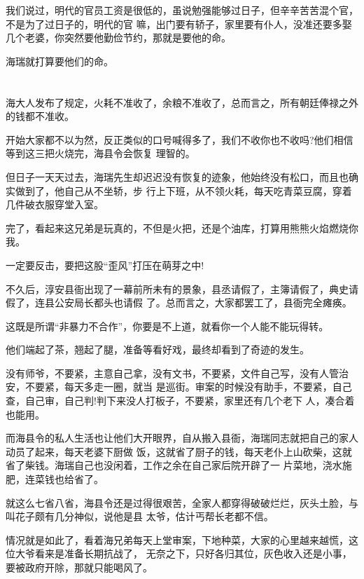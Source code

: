 \documentclass[11pt,a4paper,onecolumn]{article}
\begin{document}
我们说过，明代的官员工资是很低的，虽说勉强能够过日子，但辛辛苦苦混个官，不是为了过日子的，明代的官
嘛，出门要有轿子，家里要有仆人，没准还要多娶几个老婆，你突然要他勤俭节约，那就是要他的命。

海瑞就打算要他们的命。

\section[\thesection]{}

海大人发布了规定，火耗不准收了，余粮不准收了，总而言之，所有朝廷俸禄之外的钱都不准收。

开始大家都不以为然，反正类似的口号喊得多了，我们不收你也不收吗?他们相信等到这三把火烧完，海县令会恢复
理智的。

但日子一天天过去，海瑞先生却迟迟没有恢复的迹象，他始终没有松口，而且也确实做到了，他自己从不坐轿，步
行上下班，从不领火耗，每天吃青菜豆腐，穿着几件破衣服穿堂入室。

完了，看起来这兄弟是玩真的，不但是火把，还是个油库，打算用熊熊火焰燃烧你我。

一定要反击，要把这股``歪风''打压在萌芽之中!

不久后，淳安县衙出现了一幕前所未有的景象，县丞请假了，主簿请假了，典史请假了，连县公安局长都头也请假
了。总而言之，大家都罢工了，县衙完全瘫痪。

这既是所谓``非暴力不合作''，你要是不上道，就看你一个人能不能玩得转。

他们端起了茶，翘起了腿，准备等看好戏，最终却看到了奇迹的发生。

没有师爷，不要紧，主意自己拿，没有文书，不要紧，文件自己写，没有人管治安，不要紧，每天多走一圈，就当
是巡街。审案的时候没有助手，不要紧，自己查，自己审，自己判!判下来没人打板子，不要紧，家里还有几个老下
人，凑合着也能用。

而海县令的私人生活也让他们大开眼界，自从搬入县衙，海瑞同志就把自己的家人动员了起来，每天老婆下厨做
饭，这就省了厨子的钱，每天老仆上山砍柴，这就省了柴钱。海瑞自己也没闲着，工作之余在自己家后院开辟了一
片菜地，浇水施肥，连菜钱也给省了。

就这么七省八省，海县令还是过得很艰苦，全家人都穿得破破烂烂，灰头土脸，与叫花子颇有几分神似，说他是县
太爷，估计丐帮长老都不信。

情况就是如此了，看着海兄弟每天上堂审案，下地种菜，大家的心里越来越慌，这位大爷看来是准备长期抗战了，
无奈之下，只好各归其位，灰色收入还是小事，要被政府开除，那就只能喝风了。

\section[\thesection]{}
\end{document}
